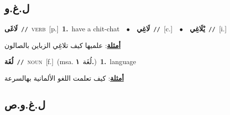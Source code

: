 \documentclass[10pt,a4paper,twoside]{article} %
\begin{document}
\begin{multicols}{2}
\vspace{-3mm}
\subsection*{\color{blue}\foreignlanguage{arabic}{ل.غ.و}\color{blue}{}} 

{\setlength\topsep{0pt}\textbf{\foreignlanguage{arabic}{لَاغَى}}\ {\color{gray}\texttt{//}\color{black}}\ \textsc{verb}\ [p.]\ \textbf{1.}~have a chit-chat\ \ $\bullet$\ \ \setlength\topsep{0pt}\textbf{\foreignlanguage{arabic}{لَاغِي}}\ {\color{gray}\texttt{//}\color{black}}\ [c.]\ \ $\bullet$\ \ \setlength\topsep{0pt}\textbf{\foreignlanguage{arabic}{يْلَاغِي}}\ {\color{gray}\texttt{//}\color{black}}\ [i.]\  \begin{flushright}\color{gray}\foreignlanguage{arabic}{\textbf{\underline{\foreignlanguage{arabic}{أمثلة}}}: علميها كيف تلاغِي الزباين بالصالون}\end{flushright}\color{black}} \vspace{2mm}

{\setlength\topsep{0pt}\textbf{\foreignlanguage{arabic}{لُغَة}}\ {\color{gray}\texttt{//}\color{black}}\ \textsc{noun}\ [f.]\ \color{gray}(msa. \foreignlanguage{arabic}{لُغَة}~\foreignlanguage{arabic}{\textbf{١.}})\color{black}\ \textbf{1.}~language\  \begin{flushright}\color{gray}\foreignlanguage{arabic}{\textbf{\underline{\foreignlanguage{arabic}{أمثلة}}}: كيف تعلمت اللغو الألمانية بهالسرعة}\end{flushright}\color{black}} \vspace{2mm}

\vspace{-3mm}
\subsection*{\color{blue}\foreignlanguage{arabic}{ل.غ.و.ص}\color{blue}{}} 


\end{multicols}
\end{document}
